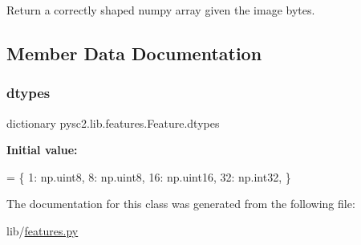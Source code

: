 \begin{DoxyVerb}Return a correctly shaped numpy array given the image bytes.\end{DoxyVerb}
 

\subsection{Member Data Documentation}
\mbox{\label{classpysc2_1_1lib_1_1features_1_1_feature_a3d5ce47166a2026a4370d0bfb1857a91}} 
\subsubsection{\texorpdfstring{dtypes}{dtypes}}
{\footnotesize\ttfamily dictionary pysc2.\+lib.\+features.\+Feature.\+dtypes\hspace{0.3cm}{\ttfamily [static]}}

{\bfseries Initial value\+:}
\begin{DoxyCode}
=  \{
      1: np.uint8,
      8: np.uint8,
      16: np.uint16,
      32: np.int32,
  \}
\end{DoxyCode}


The documentation for this class was generated from the following file\+:\begin{DoxyCompactItemize}
\item 
lib/\mbox{\hyperlink{features_8py}{features.\+py}}\end{DoxyCompactItemize}
